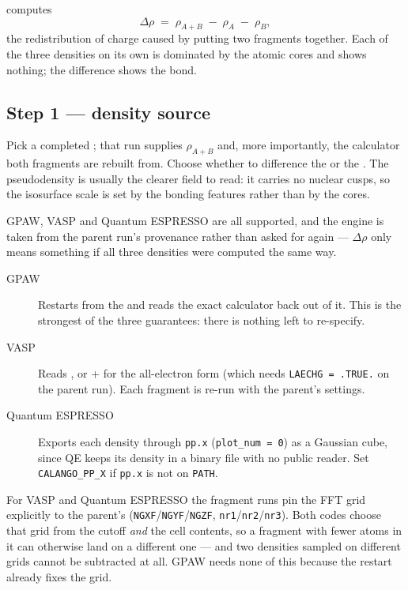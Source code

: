 \menusep{} computes
\[
  \Delta\rho \;=\; \rho_{A+B} \;-\; \rho_{A} \;-\; \rho_{B},
\]
the redistribution of charge caused by putting two fragments together. Each
of the three densities on its own is dominated by the atomic cores and shows
nothing; the difference shows the bond.

\subsection{Step 1 --- density source}

Pick a completed \menusep{};
that run supplies $\rho_{A+B}$ and, more importantly, the calculator both
fragments are rebuilt from. Choose whether to difference the
 or the . The pseudodensity is
usually the clearer field to read: it carries no nuclear cusps, so the
isosurface scale is set by the bonding features rather than by the cores.

GPAW, VASP and Quantum ESPRESSO are all supported, and the engine is taken
from the parent run's provenance rather than asked for again --- $\Delta\rho$
only means something if all three densities were computed the same way.

\begin{description}
  \item[GPAW] Restarts from the  and reads the exact calculator
    back out of it. This is the strongest of the three guarantees: there is
    nothing left to re-specify.
  \item[VASP] Reads , or  +  for the
    all-electron form (which needs \texttt{LAECHG = .TRUE.} on the parent
    run). Each fragment is re-run with the parent's settings.
  \item[Quantum ESPRESSO] Exports each density through \texttt{pp.x}
    (\texttt{plot\_num = 0}) as a Gaussian cube, since QE keeps its density in
    a binary file with no public reader. Set \texttt{CALANGO\_PP\_X} if
    \texttt{pp.x} is not on \texttt{PATH}.
\end{description}

\begin{calwarn}
For VASP and Quantum ESPRESSO the fragment runs pin the FFT grid explicitly to
the parent's (\texttt{NGXF}/\texttt{NGYF}/\texttt{NGZF},
\texttt{nr1}/\texttt{nr2}/\texttt{nr3}). Both codes choose that grid from the
cutoff \emph{and} the cell contents, so a fragment with fewer atoms in it can
otherwise land on a different one --- and two densities sampled on different
grids cannot be subtracted at all. GPAW needs none of this because the restart
already fixes the grid.
\end{calwarn}

